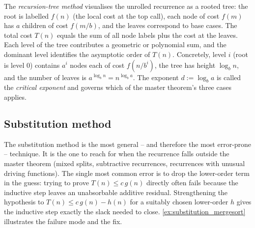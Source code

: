 \begin{definition}
\label{def:recursion_tree}
The \emph{recursion-tree method} visualises the unrolled recurrence as a rooted tree: the root is labelled $f(n)$ (the local cost at the top call), each node of cost $f(m)$ has $a$ children of cost $f(m/b)$, and the leaves correspond to base cases. The total cost $T(n)$ equals the sum of all node labels plus the cost at the leaves. Each level of the tree contributes a geometric or polynomial sum, and the dominant level identifies the asymptotic order of $T(n)$. Concretely, level $i$ (root is level $0$) contains $a^i$ nodes each of cost $f(n/b^i)$, the tree has height $\log_b n$, and the number of leaves is $a^{\log_b n} = n^{\log_b a}$. The exponent $d := \log_b a$ is called the \emph{critical exponent} and governs which of the master theorem's three cases applies.
\end{definition}

\subsection{Substitution method}

The substitution method is the most general -- and therefore the most error-prone -- technique. It is the one to reach for when the recurrence falls outside the master theorem (mixed splits, subtractive recurrences, recurrences with unusual driving functions). The single most common error is to drop the lower-order term in the guess: trying to prove $T(n) \le c\,g(n)$ directly often fails because the inductive step leaves an unabsorbable additive residual. Strengthening the hypothesis to $T(n) \le c\,g(n) - h(n)$ for a suitably chosen lower-order $h$ gives the inductive step exactly the slack needed to close. \cref{ex:substitution_mergesort} illustrates the failure mode and the fix.

